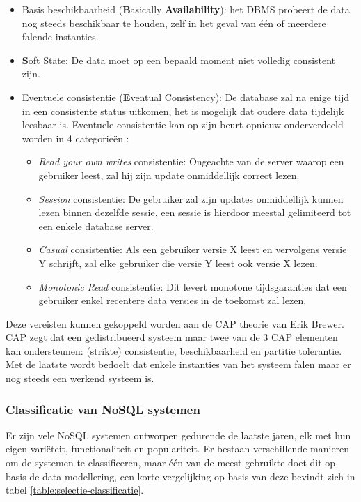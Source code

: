 \begin{itemize}
 \item Basis beschikbaarheid (\textbf{B}asically \textbf{Availability}): het DBMS probeert de data nog steeds beschikbaar te houden, zelf in het geval van één of meerdere falende instanties. 
 \item \textbf{S}oft State: De data moet op een bepaald moment niet volledig consistent zijn. 
 \item Eventuele consistentie (\textbf{E}ventual Consistency): De database zal na enige tijd in een consistente status uitkomen, het is mogelijk dat oudere data tijdelijk leesbaar is. Eventuele consistentie kan op zijn beurt opnieuw onderverdeeld worden in 4 categorieën \cite[slide 16]{lipcon2009design}:
 	\begin{itemize}
 		\item \textit{Read your own writes} consistentie: Ongeachte van de server waarop een gebruiker leest, zal hij zijn update onmiddellijk correct lezen. 
 		\item \textit{Session} consistentie: De gebruiker zal zijn updates onmiddellijk kunnen lezen binnen dezelfde sessie, een sessie is hierdoor meestal gelimiteerd tot een enkele database server. 
 		\item \textit{Casual} consistentie: Als een gebruiker versie X leest en vervolgens versie Y schrijft, zal elke gebruiker die versie Y leest ook versie X lezen.
 		\item \textit{Monotonic Read} consistentie: Dit levert monotone tijdsgaranties dat een gebruiker enkel recentere data versies in de toekomst zal lezen. 
 	\end{itemize}
\end{itemize}
Deze vereisten kunnen gekoppeld worden aan de CAP theorie van Erik Brewer\cite{Brewer:2000:TRD:343477.343502}. CAP zegt dat een gedistribueerd systeem maar twee van de 3 CAP elementen kan ondersteunen: (strikte) consistentie, beschikbaarheid en partitie tolerantie. Met de laatste wordt bedoelt dat enkele instanties van het systeem falen maar er nog steeds een werkend systeem is.  

\subsubsection{Classificatie van NoSQL systemen}
Er zijn vele NoSQL systemen ontworpen gedurende de laatste jaren, elk met hun eigen variëteit, functionaliteit en populariteit. Er bestaan verschillende manieren om de systemen te classificeren, maar één van de meest gebruikte doet dit op basis de data modellering, een korte vergelijking op basis van deze bevindt zich in tabel \ref{table:selectie-classificatie}.  

